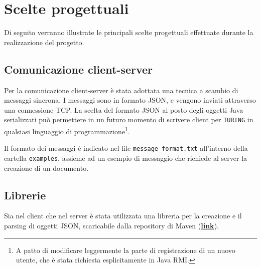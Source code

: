 \section{Scelte progettuali}
Di seguito verranno illustrate le principali scelte progettuali effettuate durante la realizzazione del progetto.





\subsection{Comunicazione client-server}
Per la comunicazione client-server è stata adottata una tecnica a scambio di messaggi sincrona. I messaggi sono in formato JSON, e vengono inviati attraverso una connessione TCP. La scelta del formato JSON al posto degli oggetti Java serializzati può permettere in un futuro momento di scrivere client per \texttt{TURING} in qualsiasi linguaggio di programmazione\footnote{A patto di modificare leggermente la parte di registrazione di un nuovo utente, che è stata richiesta esplicitamente in Java RMI.}.

\medskip

Il formato dei messaggi è indicato nel file \texttt{message\_format.txt} all'interno della cartella \texttt{examples}, assieme ad un esempio di messaggio che richiede al server la creazione di un documento.

\subsection{Librerie}
Sia nel client che nel server è stata utilizzata una libreria per la creazione e il parsing di oggetti JSON, scaricabile dalla repository di Maven (\href{https://mvnrepository.com/artifact/org.json/json}{\textbf{link}}).
